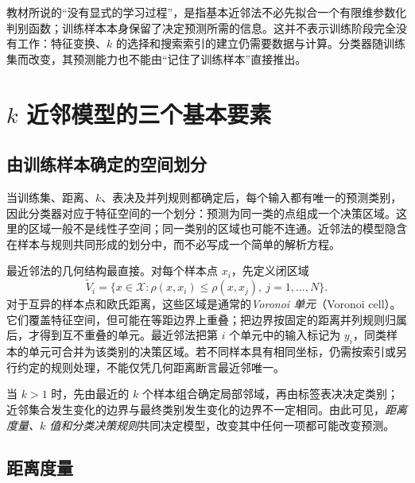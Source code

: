 教材所说的“没有显式的学习过程”，是指基本近邻法不必先拟合一个有限维参数化判别函数；训练样本本身保留了决定预测所需的信息。这并不表示训练阶段完全没有工作：特征变换、$k$ 的选择和搜索索引的建立仍需要数据与计算。分类器随训练集而改变，其预测能力也不能由“记住了训练样本”直接推出。

\section{$k$ 近邻模型的三个基本要素}
\label{sec:lihang-knn-model}

\subsection{由训练样本确定的空间划分}
\label{subsec:lihang-knn-partition}

当训练集、距离、$k$、表决及并列规则都确定后，每个输入都有唯一的预测类别，因此分类器对应于特征空间的一个划分：预测为同一类的点组成一个决策区域。这里的区域一般不是线性子空间；同一类别的区域也可能不连通。近邻法的模型隐含在样本与规则共同形成的划分中，而不必写成一个简单的解析方程。

最近邻法的几何结构最直接。对每个样本点 $x_i$，先定义闭区域
\begin{equation}
  \widetilde V_i
  =\{x\in\mathcal X:\rho(x,x_i)\leq\rho(x,x_j),\ j=1,\ldots,N\}.
  \label{eq:lihang-knn-cell}
\end{equation}
对于互异的样本点和欧氏距离，这些区域是通常的\emph{Voronoi 单元}（Voronoi cell）。它们覆盖特征空间，但可能在等距边界上重叠；把边界按固定的距离并列规则归属后，才得到互不重叠的单元。最近邻法把第 $i$ 个单元中的输入标记为 $y_i$，同类样本的单元可合并为该类别的决策区域。若不同样本具有相同坐标，仍需按索引或另行约定的规则处理，不能仅凭几何距离断言最近邻唯一。

当 $k>1$ 时，先由最近的 $k$ 个样本组合确定局部邻域，再由标签表决决定类别；近邻集合发生变化的边界与最终类别发生变化的边界不一定相同。由此可见，\emph{距离度量、$k$ 值和分类决策规则}共同决定模型，改变其中任何一项都可能改变预测。

\subsection{距离度量}
\label{subsec:lihang-knn-distance}

